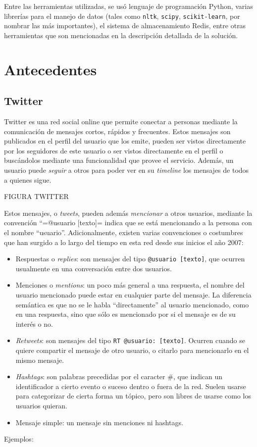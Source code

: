 \documentclass[upright, contnum]{umemoria}
\begin{document}
   Entre las herramientas utilizadas, se usó lenguaje de
   programación Python, varias librerías para el manejo de datos
   (tales como \texttt{nltk}, \texttt{scipy}, \texttt{scikit-learn}, por nombrar las más
   importantes), el sistema de almacenamiento Redis, entre otras
   herramientas que son mencionadas en la descripción detallada de la
   solución.

\chapter{Antecedentes}
\label{sec-2}

\section{Twitter}
\label{sec-2.1}

Twitter es una red social online que permite conectar a
personas mediante la comunicación de mensajes cortos, rápidos y frecuentes. Estos
mensajes son publicados en el perfil del usuario que los emite, pueden
ser vistos directamente por los seguidores de este usuario o ser
vistos directamente en el perfil o buscándolos mediante una
funcionalidad que provee el servicio. Además, un usuario puede
\emph{seguir} a otros para poder ver en su \emph{timeline} los mensajes de todos
a quienes sigue.

FIGURA TWITTER

Estos mensajes, o \emph{tweets}, pueden además \emph{mencionar} a otros
usuarios, mediante la convención ``=@usuario [texto]= indica que 
se está mencionando a la persona con el nombre ``usuario''. Adicionalmente,
existen varias convenciones o costumbres que han surgido a lo largo
del tiempo en esta red desde sus inicios el año 2007:


\begin{itemize}
\item Respuestas o \emph{replies}: son mensajes del tipo \texttt{@usuario [texto]},
  que ocurren usualmente en una conversación entre dos usuarios.
\item Menciones o \emph{mentions}: un poco más general a una respuesta, el
  nombre del usuario mencionado puede estar en cualquier parte del
  mensaje. La diferencia semántica es que no se le habla
  ``directamente'' al usuario mencionado, como en una respuesta, sino
  que sólo es mencionado por si el mensaje es de su interés o no.
\item \emph{Retweets}: son mensajes del tipo \texttt{RT @usuario: [texto]}. Ocurren
  cuando se quiere compartir el mensaje de otro usuario, o citarlo
  para mencionarlo en el mismo mensaje.
\item \emph{Hashtags}: son palabras precedidas por el caracter \#, que indican
  un identificador a cierto evento o suceso dentro o fuera de la
  red. Suelen usarse para categorizar de cierta forma un tópico, pero
  son libres de usarse como los usuarios quieran.
\item Mensaje simple: un mensaje sin menciones ni hashtags.
\end{itemize}
Ejemplos:
\end{document}

